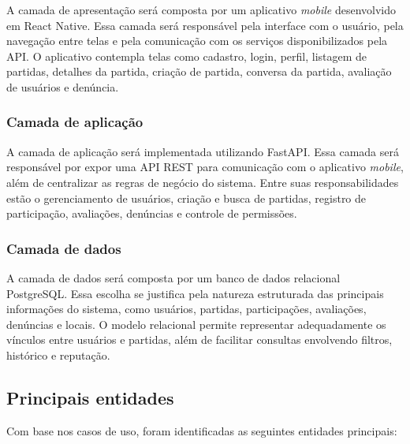 \documentclass[a4paper, 12pt]{article}
\begin{document}
\begin{justify}
A camada de apresentação será composta por um aplicativo \textit{mobile} desenvolvido em React Native. Essa camada será responsável pela interface com o usuário, pela navegação entre telas e pela comunicação com os serviços disponibilizados pela API. O aplicativo contempla telas como cadastro, login, perfil, listagem de partidas, detalhes da partida, criação de partida, conversa da partida, avaliação de usuários e denúncia.

\subsubsection{Camada de aplicação}

A camada de aplicação será implementada utilizando FastAPI. Essa camada será responsável por expor uma API REST para comunicação com o aplicativo \textit{mobile}, além de centralizar as regras de negócio do sistema. Entre suas responsabilidades estão o gerenciamento de usuários, criação e busca de partidas, registro de participação, avaliações, denúncias e controle de permissões.

\subsubsection{Camada de dados}

A camada de dados será composta por um banco de dados relacional PostgreSQL. Essa escolha se justifica pela natureza estruturada das principais informações do sistema, como usuários, partidas, participações, avaliações, denúncias e locais. O modelo relacional permite representar adequadamente os vínculos entre usuários e partidas, além de facilitar consultas envolvendo filtros, histórico e reputação.

\subsection{Principais entidades}

Com base nos casos de uso, foram identificadas as seguintes entidades principais:


\end{justify}
\end{document}
